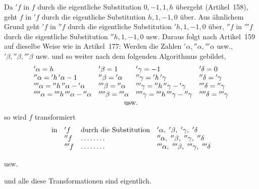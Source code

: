 Da ${}'f$ in $f$ durch die eigentliche Substitution $0,-1,1,h$ übergeht (Artikel~158), geht $f$ in ${}'f$ durch die eigentliche Substitution $h,1,-1,0$ über. Aus ähnlichem Grund geht ${}'f$ in ${}''f$ durch die eigentliche Substitution ${}'h,1,-1,0$ über, ${}''f$ in ${}'''f$ durch die eigentliche Substitution ${}''h,1,-1,0$ usw. Daraus folgt nach Artikel~159 auf dieselbe Weise wie in Artikel~177: Werden die Zahlen ${}'\alpha,{}''\alpha,{}'''\alpha$ usw., ${}'\beta,{}''\beta,{}'''\beta$ usw. und so weiter nach dem folgenden Algorithmus gebildet,
{\small
\setlength{\arraycolsep}{3pt}
\[
\begin{array}{llll}
{}'\alpha=h&{}'\beta=1&{}'\gamma=-1&{}'\delta=0\\
{}''\alpha={}'h\,{}'\alpha-1&{}''\beta={}'\alpha&{}''\gamma={}'h\,{}'\gamma&{}''\delta={}'\gamma\\
{}'''\alpha={}''h\,{}''\alpha-{}'\alpha&{}'''\beta={}''\alpha&{}'''\gamma={}''h\,{}''\gamma-{}'\gamma&{}'''\delta={}''\gamma\\
{}''''\alpha={}'''h\,{}'''\alpha-{}''\alpha&{}''''\beta={}'''\alpha&{}''''\gamma={}'''h\,{}'''\gamma-{}''\gamma&{}''''\delta={}'''\gamma
\\
\multicolumn{4}{c}{\text{usw.}}
\end{array}
\]
}
so wird $f$ transformiert
\[
\begin{array}{@{}rlll@{}}
\text{in}&{}'f&\text{durch die Substitution}&{}'\alpha,\ {}'\beta,\ {}'\gamma,\ {}'\delta\\
&{}''f&\mathinner{\ldotp\ldotp\ldotp\ldotp\ldotp\ldotp\ldotp\ldotp}&{}''\alpha,\ {}''\beta,\ {}''\gamma,\ {}''\delta\\
&{}'''f&\mathinner{\ldotp\ldotp\ldotp\ldotp\ldotp\ldotp\ldotp\ldotp}&{}'''\alpha,\ {}'''\beta,\ {}'''\gamma,\ {}'''\delta
\end{array}
\]
\centerline{usw.}
und alle diese Transformationen sind eigentlich.

